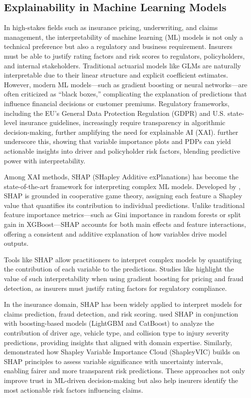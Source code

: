 \documentclass[
  number,
  review,
  3p]{elsarticle}
\begin{document}
\subsection{\texorpdfstring{\textbf{Explainability in Machine Learning
Models}}{Explainability in Machine Learning Models}}\label{explainability-in-machine-learning-models}

In high-stakes fields such as insurance pricing, underwriting, and
claims management, the interpretability of machine learning (ML) models
is not only a technical preference but also a regulatory and business
requirement. Insurers must be able to justify rating factors and risk
scores to regulators, policyholders, and internal stakeholders.
Traditional actuarial models like GLMs are naturally interpretable due
to their linear structure and explicit coefficient estimates. However,
modern ML models---such as gradient boosting or neural networks---are
often criticized as ``black boxes,'' complicating the explanation of
predictions that influence financial decisions or customer premiums.
Regulatory frameworks, including the EU's General Data Protection
Regulation (GDPR) and U.S. state-level insurance guidelines,
increasingly require transparency in algorithmic decision-making,
further amplifying the need for explainable AI (XAI). \citet{henckaerts}
further underscore this, showing that variable importance plots and PDPs
can yield actionable insights into driver and policyholder risk factors,
blending predictive power with interpretability.

Among XAI methods, SHAP (SHapley Additive exPlanations) has become the
state-of-the-art framework for interpreting complex ML models. Developed
by \citet{lundberg}, SHAP is grounded in cooperative game theory,
assigning each feature a Shapley value that quantifies its contribution
to individual predictions. Unlike traditional feature importance
metrics---such as Gini importance in random forests or split gain in
XGBoost---SHAP accounts for both main effects and feature interactions,
offering a consistent and additive explanation of how variables drive
model outputs.

Tools like SHAP allow practitioners to interpret complex models by
quantifying the contribution of each variable to the predictions.
Studies like \citet{mohamed} highlight the value of such
interpretability when using gradient boosting for pricing and fraud
detection, as insurers must justify rating factors for regulatory
compliance.

In the insurance domain, SHAP has been widely applied to interpret
models for claims prediction, fraud detection, and risk scoring.
\citet{dong} used SHAP in conjunction with boosting-based models
(LightGBM and CatBoost) to analyze the contribution of driver age,
vehicle type, and collision type to injury severity predictions,
providing insights that aligned with domain expertise. Similarly,
\citet{ning} demonstrated how Shapley Variable Importance Cloud
(ShapleyVIC) builds on SHAP principles to assess variable significance
with uncertainty intervals, enabling fairer and more transparent risk
predictions. These approaches not only improve trust in ML-driven
decision-making but also help insurers identify the most actionable risk
factors influencing claims.
\end{document}
